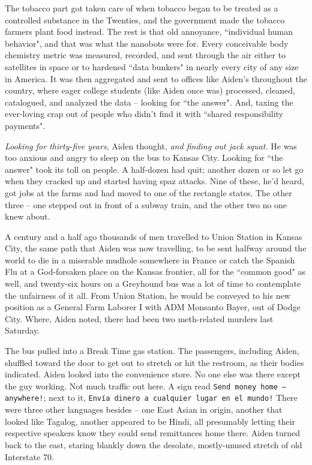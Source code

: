 \documentclass[11pt]{book}
\begin{document}
	The tobacco part got taken care of when tobacco began to be treated as a controlled substance in the Twenties, and the government made the tobacco farmers plant food instead. The rest is that old annoyance, ``individual human behavior", and that was what the nanobots were for. Every conceivable body chemistry metric was measured, recorded, and sent through the air either to satellites in space or to hardened ``data bunkers" in nearly every city of any size in America. It was then aggregated and sent to offices like Aiden's throughout the country, where eager college students (like Aiden once was) processed, cleaned, catalogued, and analyzed the data -- looking for ``the answer". And, taxing the ever-loving crap out of people who didn't find it with ``shared responsibility payments".
	
	\textit{Looking for thirty-five years}, Aiden thought, \textit{and finding out jack squat.} He was too anxious and angry to sleep on the bus to Kansas City. Looking for ``the answer" took its toll on people. A half-dozen had quit; another dozen or so let go when they cracked up and started having spaz attacks. Nine of these, he'd heard, got jobs at the farms and had moved to one of the rectangle states. The other three -- one stepped out in front of a subway train, and the other two no one knew about.
	
	A century and a half ago thousands of men travelled to Union Station in Kansas City, the same path that Aiden was now travelling, to be sent halfway around the world to die in a miserable mudhole somewhere in France or catch the Spanish Flu at a God-forsaken place on the Kansas frontier, all for the ``common good" as well, and twenty-six hours on a Greyhound bus was a lot of time to contemplate the unfairness of it all. From Union Station, he would be conveyed to his new position as a General Farm Laborer I with ADM Monsanto Bayer, out of Dodge City. Where, Aiden noted, there had been two meth-related murders last Saturday.
	
	The bus pulled into a Break Time gas station. The passengers, including Aiden, shuffled toward the door to get out to stretch or hit the restroom, as their bodies indicated. Aiden looked into the convenience store. No one else was there except the guy working. Not much traffic out here. A sign read \texttt{Send money home -- anywhere!}; next to it, \texttt{\textexclamdown Envía dinero a cualquier lugar en el mundo!} There were three other languages besides -- one East Asian in origin, another that looked like Tagalog, another appeared to be Hindi, all presumably letting their respective speakers know they could send remittances home there. Aiden turned back to the east, staring blankly down the desolate, mostly-unused stretch of old Interstate 70.
	
\end{document}
